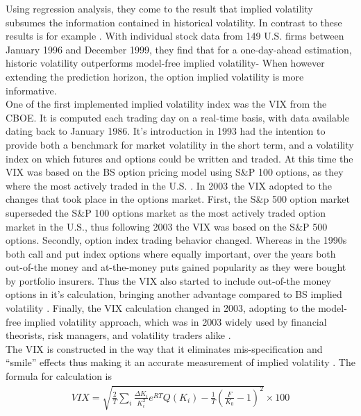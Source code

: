 Using regression analysis, they come to the result that implied volatility subsumes the information contained in historical volatility. In contrast to these results is for example \textcite{taylor2010}. With individual stock data from 149 U.S. firms between January 1996 and December 1999, they find that for a one-day-ahead estimation, historic volatility outperforms model-free implied volatility- When however extending the prediction horizon, the option implied volatility is more informative. \\
One of the first implemented implied volatility index was the \ac{VIX} from the \ac{CBOE}. It is computed each trading day on a real-time basis, with data available dating back to January 1986. It's introduction in 1993 had the intention to provide both a benchmark for market volatility in the short term, and a volatility index on which futures and options could be written and traded. At this time the \ac{VIX} was based on the \ac{BS} option pricing model using S\&P 100 options, as they where the most actively traded in the U.S. \parencite{whaley1995}. In 2003 the \ac{VIX} adopted to the changes that took place in the options market. First, the S\&p 500 option market superseded the S\&P 100 options market as the most actively traded option market in the U.S., thus following 2003 the \ac{VIX} was based on the S\&P 500 options. Secondly, option index trading behavior changed. Whereas in the 1990s both call and put index options where equally important, over the years both out-of-the money and at-the-money puts gained popularity as they were bought by portfolio insurers. Thus the \ac{VIX} also started to include out-of-the money options in it's calculation, bringing another advantage compared to \ac{BS} implied volatility \parencite{whaley2008}. Finally, the \ac{VIX} calculation changed in 2003, adopting to the model-free implied volatility approach, which was in 2003 widely used by financial theorists, risk managers, and volatility traders alike \parencite{exchange2009}.\\
The \ac{VIX} is constructed in the way that it eliminates mis-specification and ``smile'' effects thus making it an accurate measurement of implied volatility \parencite{blair2001}. The formula for calculation is
\begin{align}\label{eq: VIX}
VIX = \sqrt{\frac{2}{T} \sum_{i} \frac{\Delta K_{i}}{K_{i}^{2}} e^{RT} Q(K_{i}) - \frac{1}{T} (\frac{F}{K_{0}} - 1)^{2}} \times 100
\end{align}

